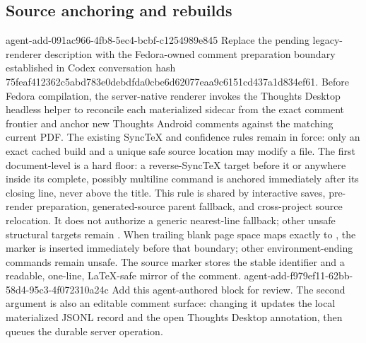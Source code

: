 \subsection*{Source anchoring and rebuilds}
\label{sec:comment-source-anchoring}
\agentProposedEdit
  {agent-add-091ac966-4fb8-5ec4-bcbf-c1254989e845}
  {Replace the pending legacy-renderer description with the Fedora-owned comment preparation boundary established in Codex conversation hash 75feaf412362c5abd783e0debdfda0cbe6d62077eaa9c6151cd437a1d834ef61.}
  {}
  {Before Fedora compilation, the server-native renderer invokes the Thoughts Desktop headless helper to reconcile each materialized sidecar from the exact comment frontier and anchor new Thoughts Android comments against the matching current PDF.}
The existing SyncTeX and \code{\ReviewAnchor} confidence rules remain in force: only an exact cached build and a unique safe source location may modify a  file.
The first document-level \code{\docTitle} is a hard floor: a reverse-SyncTeX
target before it or anywhere inside its complete, possibly multiline command
is anchored immediately after its closing line, never above the title.
This rule is shared by interactive saves, pre-render preparation,
generated-source parent fallback, and cross-project source relocation.
It does not authorize a generic nearest-line fallback; other unsafe
structural targets remain .
When trailing blank page space maps exactly to , the marker is inserted immediately before that boundary; other environment-ending commands remain unsafe.
The source marker stores the stable identifier and a readable, one-line,
LaTeX-safe mirror of the comment.
\agentProposedEdit
  {agent-add-f979ef11-62bb-58d4-95c3-4f072310a24c}
  {Add this agent-authored block for review.}
  {}
  {The second argument is also an editable comment surface: changing it updates the local materialized JSONL record and the open Thoughts Desktop annotation, then queues the durable server operation.}
